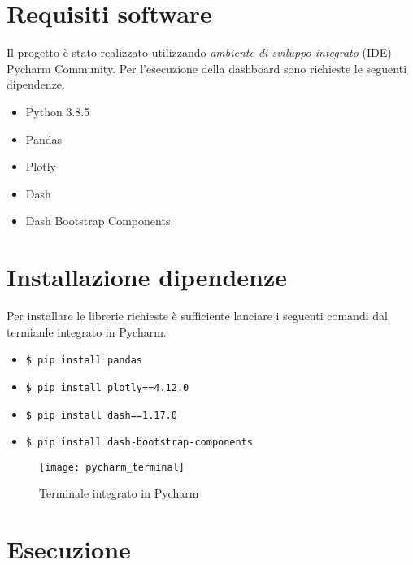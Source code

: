 
\section{Requisiti software}
Il progetto è stato realizzato utilizzando \emph{ambiente di sviluppo integrato} (IDE) Pycharm Community.
Per l'esecuzione della dashboard sono richieste le seguenti dipendenze.
\begin{itemize}
 \item Python 3.8.5
 \item Pandas
 \item Plotly 
 \item Dash 
 \item Dash Bootstrap Components
 \end{itemize}
 
 \section{Installazione dipendenze}
 Per installare le librerie richieste è sufficiente lanciare i seguenti comandi dal termianle integrato in Pycharm.
 
 \begin{itemize}
     \item \texttt{\$ pip install pandas}
     \item \texttt{\$ pip install plotly==4.12.0}
     \item \texttt{\$ pip install dash==1.17.0}
     \item \texttt{\$ pip install dash-bootstrap-components}
 \end{itemize}
 
 \begin{figure}[htp]
    \centering
    \texttt{[image: pycharm\_terminal]}
    \caption{Terminale integrato in Pycharm}
    \label{fig:pycharm_termianl}
\end{figure}

\section{Esecuzione}
 
 
